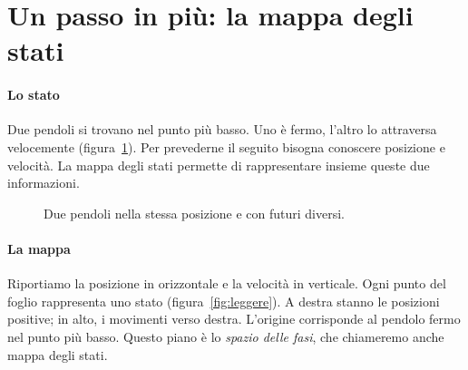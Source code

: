 \documentclass[11pt,a4paper,twoside=false,headinclude,footinclude]{scrartcl}
\begin{document}
\section{Un passo in più: la mappa degli stati}\label{sec:mappa}

\paragraph{Lo stato} Due pendoli si trovano nel punto più basso. Uno è fermo, l'altro lo attraversa velocemente (figura~\ref{fig:velocita}). Per prevederne il seguito bisogna conoscere posizione e velocità. La mappa degli stati permette di rappresentare insieme queste due informazioni.

\begin{figure}[htbp]
\centering
{}
\caption{Due pendoli nella stessa posizione e con futuri diversi.}
\label{fig:velocita}
\end{figure}

\paragraph{La mappa} Riportiamo la posizione in orizzontale e la velocità in verticale. Ogni punto del foglio rappresenta uno stato (figura~\ref{fig:leggere}). A destra stanno le posizioni positive; in alto, i movimenti verso destra. L'origine corrisponde al pendolo fermo nel punto più basso. Questo piano è lo \emph{spazio delle fasi}, che chiameremo anche mappa degli stati.
\end{document}
